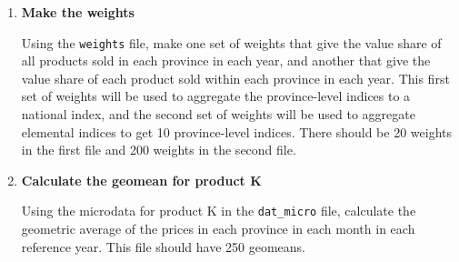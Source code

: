 \documentclass[]{article}
\newenvironment{Shaded}{\begin{snugshade}}{\end{snugshade}}
\newcommand{\CommentTok}[1]{\textcolor[rgb]{0.56,0.35,0.01}{\textit{#1}}}
\newcommand{\DataTypeTok}[1]{\textcolor[rgb]{0.13,0.29,0.53}{#1}}
\newcommand{\KeywordTok}[1]{\textcolor[rgb]{0.13,0.29,0.53}{\textbf{#1}}}
\newcommand{\NormalTok}[1]{#1}
\newcommand{\OperatorTok}[1]{\textcolor[rgb]{0.81,0.36,0.00}{\textbf{#1}}}
\newcommand{\StringTok}[1]{\textcolor[rgb]{0.31,0.60,0.02}{#1}}
\begin{document}
\begin{enumerate}
\def\labelenumi{\arabic{enumi}.}
\item
  \textbf{Make the weights}

  Using the \texttt{weights} file, make one set of weights that give the value share of all products sold in each province in each year, and another that give the value share of each product sold within each province in each year. This first set of weights will be used to aggregate the province-level indices to a national index, and the second set of weights will be used to aggregate elemental indices to get 10 province-level indices. There should be 20 weights in the first file and 200 weights in the second file.

\begin{Shaded}
\end{Shaded}
\item
  \textbf{Calculate the geomean for product K}

  Using the microdata for product K in the \texttt{dat\_micro} file, calculate the geometric average of the prices in each province in each month in each reference year. This file should have 250 geomeans.


\end{enumerate}
\end{document}
